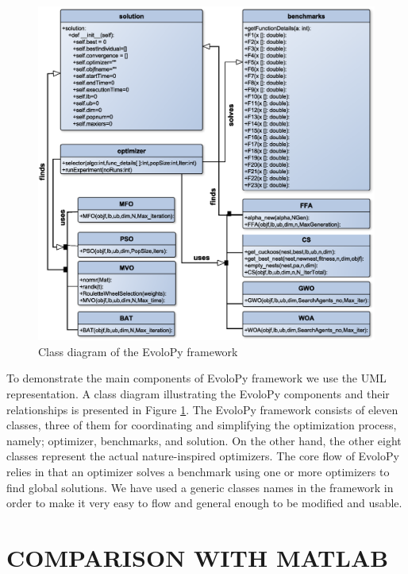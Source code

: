 \documentclass[a4paper,twoside]{article}
\begin{document}
\begin{figure}
\centerline{\includegraphics[scale=0.35]{classD.eps}}
\caption{Class diagram of the EvoloPy framework}
\label{fig:framework}
\end{figure}

To demonstrate the main components of EvoloPy framework we use the UML representation. A class diagram illustrating the EvoloPy components and their relationships is presented in Figure \ref{fig:framework}. The EvoloPy framework consists of eleven classes, three of them for coordinating and simplifying the optimization process, namely; optimizer, benchmarks, and solution. On the other hand, the other eight classes represent the actual nature-inspired optimizers. The core flow of EvoloPy relies in that an optimizer solves a benchmark using one or more optimizers to find global solutions. We have used a generic classes names in the framework in order to make it very easy to flow and general enough to be modified and usable.





\section{\uppercase{Comparison with Matlab}}
\end{document}
